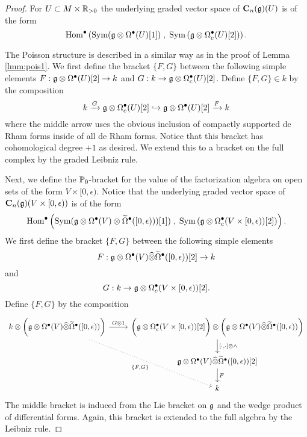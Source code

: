 \documentclass[11pt]{amsart}
\numberwithin{equation}{section}
\begin{document}
\begin{proof}
For $U \subset M \times \mathbb R_{>0}$ the underlying graded vector space of $\mathbf C_n(\mathfrak g)(U)$ is of the form
\[
{\rm Hom}^\bullet\left({\rm Sym}(\mathfrak g \otimes \Omega^\bullet (U)[1]) \; , \; {\rm Sym}  \left(\mathfrak g \otimes \Omega^\bullet_c(U) [2] \right) \right)  .
\]

The Poisson structure is described in a similar way as in the proof of Lemma \ref{lmm:pois1}. 
We first define the bracket $\{F,G\}$ between the following simple elements $F : \mathfrak g \otimes \Omega^\bullet (U)[2] \to k$ and $G : k \to \mathfrak g \otimes \Omega^\bullet_c(U)[2]$. 
Define $\{F, G\} \in k$ by the composition
\[
k \xrightarrow{G} \mathfrak g \otimes \Omega^\bullet_c(U)[2] \hookrightarrow \mathfrak g \otimes \Omega^\bullet(U)[2] \xrightarrow{F} k
\]
where the middle arrow uses the obvious inclusion of compactly supported de Rham forms inside of all de Rham forms. 
Notice that this bracket has cohomological degree $+1$ as desired.
We extend this to a bracket on the full complex by the graded Leibniz rule. 

Next, we define the $\mathbb P_0$-bracket for the value of the factorization algebra on open sets of the form $V \times [0,\epsilon)$. 
Notice that the underlying graded vector space of $\mathbf C_n(\mathfrak g)(V \times [0,\epsilon))$ is of the form
\[
{\rm Hom}^\bullet\left({\rm Sym}(\mathfrak g \otimes \Omega^\bullet (V) \otimes \widetilde{\Omega}^\bullet ([0,\epsilon))) [1]) \; , \; {\rm Sym} \left(\mathfrak g \otimes \Omega^\bullet_c(V \times [0,\epsilon)) [2] \right) \right)  .
\]
We first define the bracket $\{F,G\}$ between the following simple elements 
\[
F : \mathfrak g \otimes \Omega^\bullet(V) \widehat{\otimes} \widetilde{\Omega}^\bullet([0,\epsilon)) [2] \to k
\]
and 
\[
G : k \to \mathfrak g \otimes \Omega^\bullet_c(V \times [0,\epsilon))[2] .
\]
Define $\{F, G\}$ by the composition
\[
\begin{tikzcd}
k \otimes \bigg(\fg \otimes \Omega^\bu(V) \Hat{\otimes} \Tilde{\Omega}^\bu([0,\epsilon)) \bigg) \ar[rdd, dotted, "{\{F,G\}}"'] \ar[r, "G \otimes 1"] & 
\bigg(\fg \otimes \Omega^\bu_c(V \times [0,\epsilon)) [2]\bigg) \otimes \bigg(\fg \otimes \Omega^\bu(V) \Hat{\otimes} \Tilde{\Omega}^\bu([0,\epsilon)) \bigg) \ar[d,"{[\cdot, \cdot] \otimes \wedge}"] \\
& \fg \otimes \Omega^\bu(V) \Hat{\otimes} \Tilde{\Omega}^\bu([0,\epsilon)) [2] \ar[d, "F"] \\ & k
\end{tikzcd}
\]
The middle bracket is induced from the Lie bracket on $\mathfrak g$ and the wedge product of differential forms.
Again, this bracket is extended to the full algebra by the Leibniz rule.
\end{proof}
\end{document}
